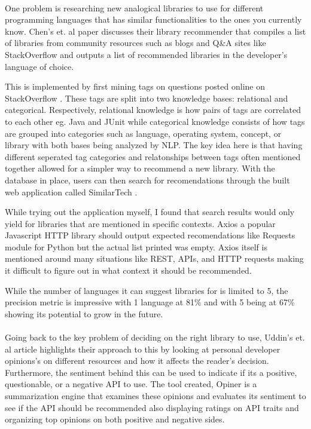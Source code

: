 \documentclass[12pt]{article}
\begin{document}
\paragraph{}
One problem is researching new analogical libraries to use for different programming languages that has similar functionalities 
to the ones you currently know. Chen's et. al \cite{analogical} paper discusses their library recommender 
that compiles a list of libraries from community resources such as blogs and Q\&A sites like StackOverflow \cite{stackoverflow} 
and outputs a list of recommended libraries in the developer's language of choice. 

This is implemented by first mining tags on questions posted online on StackOverflow \cite{stackoverflow}.
These tags are split into two knowledge bases: relational and categorical. Respectively, relational knowledge is how pairs of
tags are correlated to each other eg. Java and JUnit while categorical knowledge consists of how tags are grouped into categories such as 
language, operating system, concept, or library with both bases being analyzed by NLP. 
The key idea here is that having different seperated tag categories and relatonships between tags often mentioned together
allowed for a simpler way to recommend a new library. With the database in place, users can then search for recomendations through the built
web application called SimilarTech \cite{similartech}.

While trying out the application myself, I found that search results would only yield for 
libraries that are mentioned in specific contexts.
Axios \cite{axios} a popular Javascript HTTP library should output expected 
recomendations like Requests \cite{requests} module for Python but the actual list printed was empty.
Axios \cite{axios} itself is mentioned around many situations like REST, APIs, and HTTP requests making it difficult to figure out in what context it should be recommended.

While the number of languages it can suggest libraries for is limited to 5, the precision metric is impressive
with 1 language at 81\% and with 5 being at 67\% showing its potential to grow in the future.

\paragraph{}
Going back to the key problem of deciding on the right library to use, Uddin's et. al \cite{opinerarticle} article
highlights their approach to this by looking at personal developer opinions's on different resources
and how it affects the reader's decision. Furthermore, the sentiment behind this can be used to indicate if its 
a positive, questionable, or a negative API to use. The tool created, Opiner \cite{opiner} is a summarization engine
that examines these opinions and evaluates its sentiment to see if the API should be recommended also displaying ratings on API traits
and organizing top opinions on both positive and negative sides. 
\end{document}
